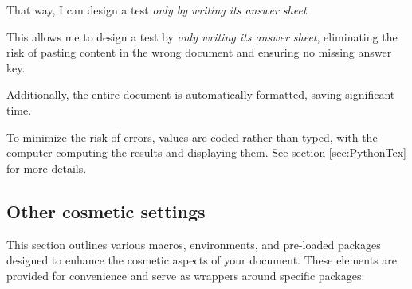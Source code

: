 \documentclass[12pt,code]{HSP-Test}
\begin{document}
\begin{enumerate}[label=\bfseries\arabic*.]
\begin{answer}
			That way, I can design a test \emph{only by writing its answer sheet}.
			
			This allows me to design a test by \emph{only writing its answer sheet}, eliminating the risk of pasting content in the wrong document and ensuring no missing answer key. 
			
			Additionally, the entire document is automatically formatted, saving significant time.
			
			To minimize the risk of errors, values are coded rather than typed, with the computer computing the results and displaying them. See section \ref{sec:PythonTex} for more details.
		\end{answer}
	\end{enumerate}
	
	\subsection{Other cosmetic settings}
	This section outlines various macros, environments, and pre-loaded packages designed to enhance the cosmetic aspects of your document. These elements are provided for convenience and serve as wrappers around specific packages:
	
\end{document}
